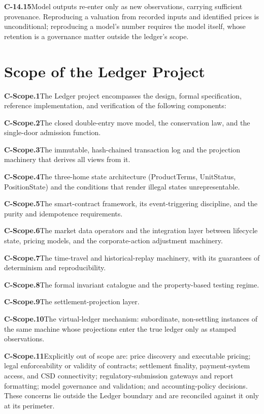 \documentclass[11pt,a4paper]{article}
\newcommand{\clause}[2]{\par\medskip\noindent\textbf{#1}\hspace{0.6em}#2}
\begin{document}
\clause{C-14.15}{Model outputs re-enter only as new observations, carrying
sufficient provenance. Reproducing a valuation from recorded inputs and identified
prices is unconditional; reproducing a model's number requires the model itself,
whose retention is a governance matter outside the ledger's scope.}

\section*{Scope of the Ledger Project}

\clause{C-Scope.1}{The Ledger project encompasses the design, formal
specification, reference implementation, and verification of the following
components:}

\clause{C-Scope.2}{The closed double-entry move model, the conservation law, and
the single-door admission function.}

\clause{C-Scope.3}{The immutable, hash-chained transaction log and the projection
machinery that derives all views from it.}

\clause{C-Scope.4}{The three-home state architecture (ProductTerms, UnitStatus,
PositionState) and the conditions that render illegal states unrepresentable.}

\clause{C-Scope.5}{The smart-contract framework, its event-triggering discipline,
and the purity and idempotence requirements.}

\clause{C-Scope.6}{The market data operators and the integration layer between
lifecycle state, pricing models, and the corporate-action adjustment machinery.}

\clause{C-Scope.7}{The time-travel and historical-replay machinery, with its
guarantees of determinism and reproducibility.}

\clause{C-Scope.8}{The formal invariant catalogue and the property-based testing
regime.}

\clause{C-Scope.9}{The settlement-projection layer.}

\clause{C-Scope.10}{The virtual-ledger mechanism: subordinate, non-settling
instances of the same machine whose projections enter the true ledger only as
stamped observations.}

\clause{C-Scope.11}{Explicitly out of scope are: price discovery and executable
pricing; legal enforceability or validity of contracts; settlement finality,
payment-system access, and CSD connectivity; regulatory-submission gateways and
report formatting; model governance and validation; and accounting-policy
decisions. These concerns lie outside the Ledger boundary and are reconciled
against it only at its perimeter.}
\end{document}
